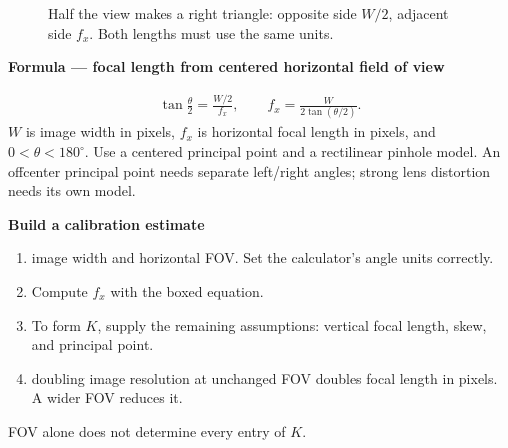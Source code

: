 \documentclass[letterpaper,11pt,english,openany,oneside]{jupyterBook}
\begin{document}
\begin{figure}[H]
\centering
\capstart

\noindent{}
\caption{Half the view makes a right triangle: opposite side \(W/2\), adjacent side \(f_x\). Both lengths must use the same units.}\label{\detokenize{lectures/lecture03/calibration:fig-lec03-fov}}\end{figure}

\begin{TextbookBox}
\textbf{Formula — focal length from centered horizontal field of view}\par\smallskip
\begin{equation}\label{equation:lectures/lecture03/calibration:eq-lec03-fov}
\begin{split}\tan\frac{\theta}{2}=\frac{W/2}{f_x},\qquad
f_x=\frac{W}{2\tan(\theta/2)}.\end{split}
\end{equation}
\sphinxAtStartPar
\(W\) is image width in pixels, \(f_x\) is horizontal focal length in pixels, and \(0<\theta<180^\circ\). Use a centered principal point and a rectilinear pinhole model. An off\sphinxhyphen{}center principal point needs separate left/right angles; strong lens distortion needs its own model.

\end{TextbookBox}

\begin{TextbookBox}
\textbf{Build a calibration estimate}\par\smallskip
\begin{enumerate}
%
\item {}
\sphinxAtStartPar
{} image width and horizontal FOV. Set the calculator’s angle units correctly.

\item {}
\sphinxAtStartPar
Compute \(f_x\) with the boxed equation.

\item {}
\sphinxAtStartPar
To form \(K\), supply the remaining assumptions: vertical focal length, skew, and principal point.

\item {}
\sphinxAtStartPar
{} doubling image resolution at unchanged FOV doubles focal length in pixels. A wider FOV reduces it.

\end{enumerate}

\sphinxAtStartPar
FOV alone does not determine every entry of \(K\).

\end{TextbookBox}
\end{document}
